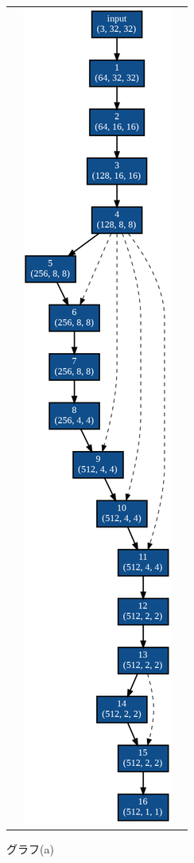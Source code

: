 \documentclass[twocolumn]{jarticle}     %
\begin{document}
\begin{figure}[tb]
\begin{tabular}{ccc}
\begin{minipage}[t]{0.3\hsize}
      \caption{グラフ(a)}
      \label{fig:max}
    \end{minipage} &
    \begin{minipage}[t]{0.3\hsize}
      \centering
      \includegraphics[clip,scale=0.25]{edge.png}

\end{minipage}
\end{tabular}
\end{figure}
\end{document}
